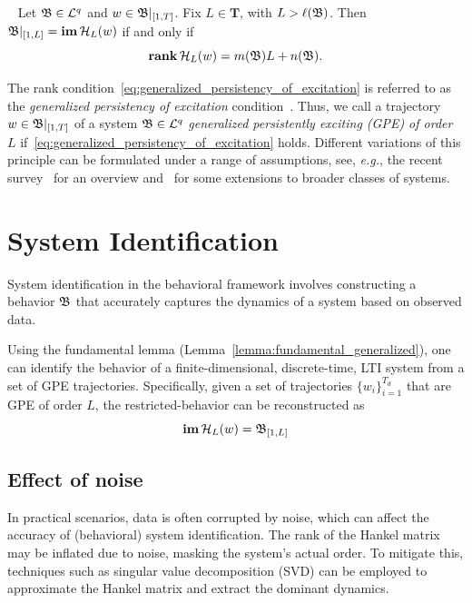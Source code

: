 \begin{lemma}~\cite[Corollary 19]{markovsky2020} \label{lemma:fundamental_generalized}
 Let ${\mathfrak{B} \in \mathcal{L}^{q}}$ and ${w \in \mathfrak{B}|_{[1,T]}}$. Fix $L\in\mathbf{T}$, with ${L > \ell(\mathfrak{B})}$. Then  $\mathfrak{B}|_{[1,L]} = \mathbf{im} \,  \mathcal{H}_L(w)$  if and only if
 \begin{equation}  \label{eq:generalized_persistency_of_excitation} 
 \mathbf{rank} \,  \mathcal{H}_L(w)   =  m(\mathfrak{B})L+ n(\mathfrak{B}).
 \end{equation}
 \end{lemma}

\noindent
The rank condition~\eqref{eq:generalized_persistency_of_excitation} is referred to as the  \emph{generalized persistency of excitation} condition~\cite{markovsky2020}. Thus, we call a trajectory ${w \in \mathfrak{B}|_{[1,T]}}$ of a system ${\mathfrak{B} \in \mathcal{L}^{q}}$ \emph{generalized persistently exciting (GPE) of order $L$} if~\eqref{eq:generalized_persistency_of_excitation} holds. Different variations of this principle can be formulated under a range of assumptions, see, \textit{e.g.}, the recent survey~\cite{markovsky2021} for an overview and~\cite{padoan2022} for some extensions to broader classes of systems.

\newpage
\section{System Identification}

System identification in the behavioral framework involves constructing a behavior $\mathfrak{B}$ that accurately captures the dynamics of a system based on observed data. 

Using the fundamental lemma (Lemma~\ref{lemma:fundamental_generalized}), one can identify the behavior of a finite-dimensional, discrete-time, LTI system from a set of GPE trajectories. Specifically, given a set of trajectories ${\{w_i\}}_{i=1}^{T_d}$ that are GPE of order $L$, the restricted-behavior can be reconstructed as
\begin{equation}
   \mathbf{im} \, \mathcal{H}_L(w) = \mathfrak{B}_{[1,L]}
\end{equation} 

\subsection{Effect of noise}
In practical scenarios, data is often corrupted by noise, which can affect the accuracy of (behavioral) system identification. The rank of the Hankel matrix may be inflated due to noise, masking the system's actual order. To mitigate this, techniques such as singular value decomposition (SVD) can be employed to approximate the Hankel matrix and extract the dominant dynamics.

